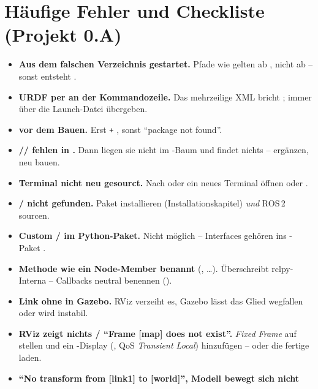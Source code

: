 \section{Häufige Fehler und Checkliste (Projekt 0.A)}
\begin{warnbox}[title={Stolpersteine, die fast jeden treffen}]
\begin{itemize}
\item \textbf{Aus dem falschen Verzeichnis gestartet.} Pfade wie
   gelten ab , nicht ab
   -- sonst entsteht .
\item \textbf{URDF per  an der Kommandozeile.} Das mehrzeilige XML
  bricht ; immer über die Launch-Datei übergeben.
\item \textbf{ vor dem Bauen.} Erst 
  \texttt{+} , sonst ``package not found''.
\item \textbf{// fehlen in
  .} Dann liegen sie nicht im -Baum und
   findet nichts --  ergänzen, neu bauen.
\item \textbf{Terminal nicht neu gesourct.} Nach  oder
   ein neues Terminal öffnen oder
  .
\item \textbf{ /  nicht gefunden.}
  Paket installieren (Installationskapitel) \emph{und} ROS\,2 sourcen.
\item \textbf{Custom / im Python-Paket.} Nicht möglich --
  Interfaces gehören ins -Paket .
\item \textbf{Methode wie ein Node-Member benannt} (, 
  \ldots). Überschreibt rclpy-Interna -- Callbacks neutral benennen
  ().
\item \textbf{Link ohne  in Gazebo.} RViz verzeiht es, Gazebo
  lässt das Glied wegfallen oder wird instabil.
\item \textbf{RViz zeigt nichts / ``Frame [map] does not exist''.} \emph{Fixed
  Frame} auf  stellen und ein -Display
  (, QoS \emph{Transient Local}) hinzufügen -- oder die
  fertige  laden.
\item \textbf{``No transform from [link1] to [world]'', Modell bewegt sich nicht
}
\end{itemize}
\end{warnbox}
